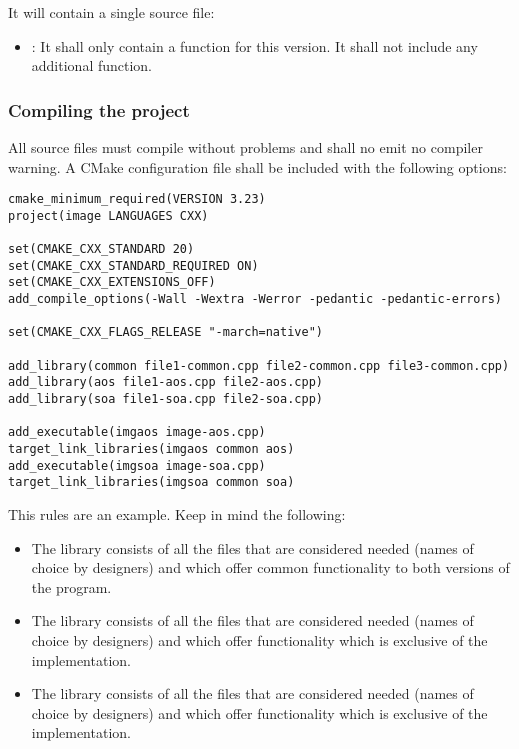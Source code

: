 It will contain a single source file:
\begin{itemize}
  \item {}: 
        It shall only contain a  function for this version.
        It shall not include any additional function.
\end{itemize}

\subsubsection{Compiling the project}

All source files must compile without problems and shall no emit no compiler warning.
A CMake configuration file shall be included with the following options:

\begin{lstlisting}[title={CmakeLists.txt},frame=single]
cmake_minimum_required(VERSION 3.23)
project(image LANGUAGES CXX)

set(CMAKE_CXX_STANDARD 20)
set(CMAKE_CXX_STANDARD_REQUIRED ON)
set(CMAKE_CXX_EXTENSIONS_OFF)
add_compile_options(-Wall -Wextra -Werror -pedantic -pedantic-errors)

set(CMAKE_CXX_FLAGS_RELEASE "-march=native")

add_library(common file1-common.cpp file2-common.cpp file3-common.cpp)
add_library(aos file1-aos.cpp file2-aos.cpp)
add_library(soa file1-soa.cpp file2-soa.cpp)

add_executable(imgaos image-aos.cpp)
target_link_libraries(imgaos common aos)
add_executable(imgsoa image-soa.cpp)
target_link_libraries(imgsoa common soa)
\end{lstlisting}

This rules are an example. Keep in mind the following:

\begin{itemize}

  \item The library  consists of all the  files
        that are considered needed (names of choice by designers) and
        which offer common functionality to both versions of the program.

  \item The library  consists of all the  files
        that are considered needed (names of choice by designers) and
        which offer functionality which is exclusive of the
         implementation.

  \item The library  consists of all the  files
        that are considered needed (names of choice by designers) and
        which offer functionality which is exclusive of the
         implementation.

\end{itemize}



